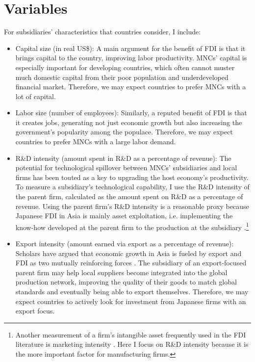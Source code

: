 \section{Variables}
\label{sec:Japan_variables}

For subsidiaries' characteristics that countries consider, I include:

\begin{itemize}
\item Capital size (in real US\$): A main argument for the benefit of FDI is
  that it brings capital to the country, improving labor productivity. MNCs'
  capital is especially important for developing countries, which often cannot
  muster much domestic capital from their poor population and underdeveloped
  financial market. Therefore, we may expect countries to prefer MNCs with a lot
  of capital.

\item Labor size (number of employees): Similarly, a reputed benefit of FDI is
  that it creates jobs, generating not just economic growth but also increasing
  the government's popularity among the populace. Therefore, we may expect
  countries to prefer MNCs with a large labor demand.

\item R\&D intensity (amount spent in R\&D as a percentage of revenue): The
  potential for technological spillover between MNCs' subsidiaries and local
  firms has been touted as a key to upgrading the host economy's productivity. To
  measure a subsidiary's technological capability, I use the R\&D intensity of
  the parent firm, calculated as the amount spent on R\&D as a percentage of
  revenue. Using the parent firm's R\&D intensity is a reasonable proxy because
  Japanese FDI in Asia is mainly asset exploitation, i.e. implementing the
  know-how developed at the parent firm to the production at the subsidiary
  \citep{Pak2005}.\footnote{Another measurement of a firm's intangible asset
    frequently used in the FDI literature is marketing intensity
    \citep{Girma2005}. Here I focus on R\&D intensity because it is the more
    important factor for manufacturing firms.}

\item Export intensity (amount earned via export as a percentage of revenue):
  Scholars have argued that economic growth in Asia is fueled by export and FDI
  as two mutually reinforcing forces \citep{Liu2002}. The subsidiary of an
  export-focused parent firm may help local suppliers become integrated into
  the global production network, improving the quality of their goods to match
  global standards and eventually being able to export themselves. Therefore, we
  may expect countries to actively look for investment from
  Japanese firms with an export focus.
\end{itemize}


